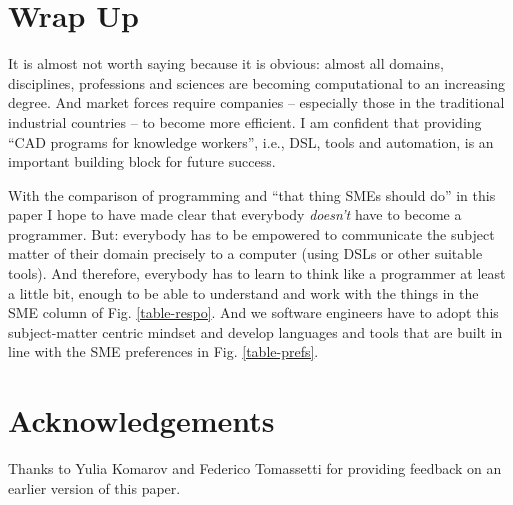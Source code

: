 \documentclass[runningheads]{llncs}
\newcommand{\fig}[1]{Fig. \ref{#1}}  %
\begin{document}
\section{Wrap Up}
\label{wrapUp}

It is almost not worth saying because it is obvious: almost all domains,
disciplines, professions and sciences are becoming computational to an 
increasing degree. And market forces require companies -- especially those
in the traditional industrial countries -- to become more efficient. I
am confident that providing ``CAD programs for knowledge workers'', i.e.,
DSL, tools and automation, is an important building block for future success.

With the comparison of programming and ``that thing SMEs should do'' in this
paper I hope to have made clear that everybody \emph{doesn't} have to become a
programmer.
But: everybody has to be empowered to communicate the subject matter of their
domain precisely to a computer (using DSLs or other suitable tools). And
therefore, everybody has to learn to think like a programmer at least a little
bit, enough to be able to understand and work with the things in the SME column
of \fig{table-respo}. And we software engineers have to adopt this
subject-matter centric mindset and develop languages and tools that are built in
line with the SME preferences in \fig{table-prefs}.

\section*{Acknowledgements}

Thanks to Yulia Komarov and Federico Tomassetti for providing feedback on 
an earlier version of this paper.






\end{document}
